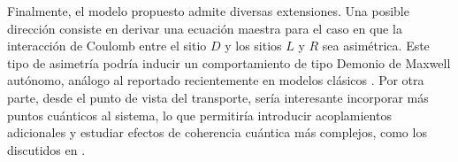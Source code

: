 Finalmente, el modelo propuesto admite diversas extensiones. Una posible dirección consiste en derivar una ecuación maestra para el caso en que la interacción de Coulomb entre el sitio $D$ y los sitios $L$ y $R$ sea asimétrica. Este tipo de asimetría podría inducir un comportamiento de tipo Demonio de Maxwell autónomo, análogo al reportado recientemente en modelos clásicos \cite{monsel2025autonomous}. Por otra parte, desde el punto de vista del transporte, sería interesante incorporar más puntos cuánticos al sistema, lo que permitiría introducir acoplamientos adicionales y estudiar efectos de coherencia cuántica más complejos, como los discutidos en \cite{khandelwal2025maximal}.








